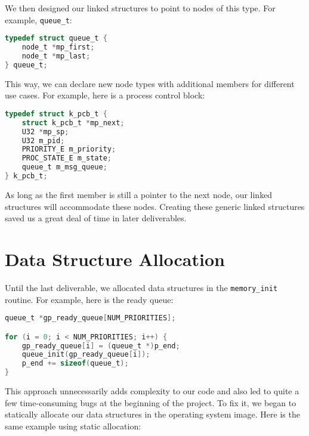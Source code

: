\documentclass[12pt]{report}
\begin{document}
We then designed our linked structures to point to nodes of this type. For example, \texttt{queue_t}:

\begin{minipage}{\textwidth}
\begin{lstlisting}[language=C]
typedef struct queue_t {
    node_t *mp_first;
    node_t *mp_last;
} queue_t;
\end{lstlisting}
\end{minipage}

This way, we can declare new node types with additional members for different use cases. For example, here is a process control block:

\begin{minipage}{\textwidth}
\begin{lstlisting}[language=C]
typedef struct k_pcb_t {
    struct k_pcb_t *mp_next;
    U32 *mp_sp;
    U32 m_pid;
    PRIORITY_E m_priority;
    PROC_STATE_E m_state;
    queue_t m_msg_queue;
} k_pcb_t;
\end{lstlisting}
\end{minipage}

As long as the first member is still a pointer to the next node, our linked structures will accommodate these nodes. Creating these generic linked structures saved us a great deal of time in later deliverables.

\section{Data Structure Allocation}

Until the last deliverable, we allocated data structures in the \texttt{memory_init} routine. For example, here is the ready queue:

\begin{minipage}{\textwidth}
\begin{lstlisting}[language=C]
queue_t *gp_ready_queue[NUM_PRIORITIES];

for (i = 0; i < NUM_PRIORITIES; i++) {
    gp_ready_queue[i] = (queue_t *)p_end;
    queue_init(gp_ready_queue[i]);
    p_end += sizeof(queue_t);
}
\end{lstlisting}
\end{minipage}

This approach unnecessarily adds complexity to our code and also led to quite a few time-consuming bugs at the beginning of the project. To fix it, we began to statically allocate our data structures in the operating system image. Here is the same example using static allocation:
\end{document}
